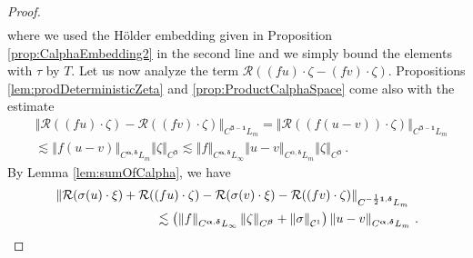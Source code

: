 \documentclass[12pt]{article}
\numberwithin{equation}{section}
\theoremstyle{plain}
\theoremstyle{definition}
\newcommand{\norm}[1]{\left\Vert #1\right\Vert}
\def\cR{\mathcal{R}}\def\cE{\mathcal{E}}
\def\falpha{{\boldsymbol\alpha}}
\def\fbeta{{\boldsymbol\beta}}
\def\fdelta{{\boldsymbol\delta}}
\def\fone{{\boldsymbol 1}}
\begin{document}
\begin{proof}
\begin{align}
    \end{align}
    where we used the H\"older embedding given in Proposition \ref{prop:CalphaEmbedding2} in the second line and we simply bound the elements with $\tau$ by $T$. %
    Let us now analyze the term $\cR((fu)\cdot\zeta -(fv)\cdot\zeta)$.  Propositions \ref{lem:prodDeterministicZeta} and \ref{prop:ProductCalphaSpace} come also with the estimate
    \begin{equation}\label{ineq:estimateRfZeta}
    \begin{split}
         &\norm{\cR((fu)\cdot\zeta)-\cR((f v)\cdot\zeta)}_{C^{\fbeta-\fone}L_m} =\norm{\cR((f(u-v))\cdot\zeta)}_{C^{\fbeta-\fone}L_m} \\&\lesssim\norm{f(u-v)}_{C^{\falpha,\fdelta}L_m}\norm{\zeta}_{C^\fbeta}
        \lesssim %
    \norm{f}_{C^{\falpha,\fdelta}L_\infty}\norm{u-v}_{C^{\alpha,\fdelta}L_m}\norm{\zeta}_{C^\fbeta}\,.
    \end{split}
    \end{equation}
     By Lemma \ref{lem:sumOfCalpha}, we have
     \begin{align*}
         &\norm{\cR(\sigma(u)\cdot\xi)+\cR((fu)\cdot\zeta) - \cR(\sigma(v)\cdot\xi) - \cR((fv)\cdot\zeta)}_{C^{-\frac 12\fone,\fdelta}L_m} \\
         &\qquad\qquad\qquad\qquad\lesssim \left(\norm{f}_{C^{\falpha,\fdelta}L_\infty} \norm{\zeta}_{C^\fbeta} + \norm{\sigma}_{\cC^1}\right)\norm{u-v}_{C^{\falpha,\fdelta}L_m}\,.

\end{align*}
\end{proof}
\end{document}
